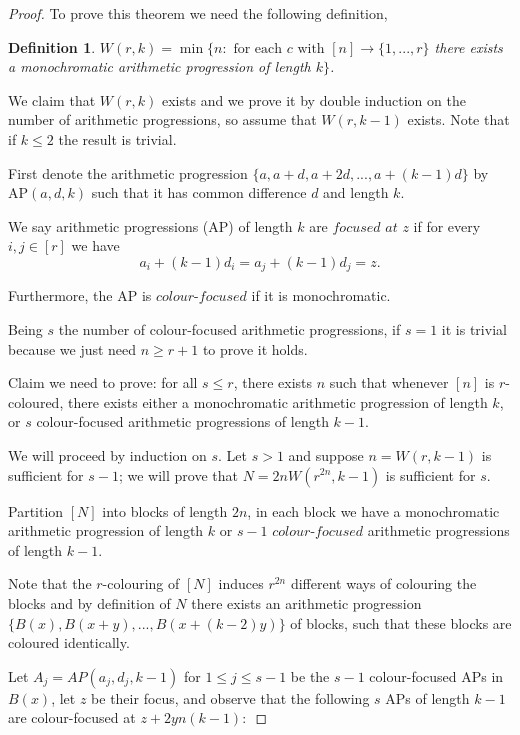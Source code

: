 \documentclass[12pt,twoside,a4paper]{book}
\numberwithin{equation}{section}
\newtheorem{definition}	[theorem] {Definition}
\theoremstyle{remark}
\begin{document}
\begin{proof}To prove this theorem we need the following definition,

\begin{definition}
$W(r,k) = \min \{n \colon \text{ for each } c \text{ with } [n] \rightarrow \{1,...,r\}$ there exists a monochromatic arithmetic  progression of length $k \}$.
\end{definition}

We claim that $W(r,k)$ exists and we prove it by double induction on the number of arithmetic progressions, so assume that $W(r, k-1)$ exists. Note that if $k \leq 2$ the result is trivial.

First denote the arithmetic progression $\{a, a + d, a +2d, ..., a+(k-1)d\}$ by AP$(a,d,k)$ such that it has common difference  $d$ and length $k$.

We say arithmetic progressions (AP) of length $k$ are $\textit{focused at}$ $z$ if for every $i,j \in [r]$ we have
$$ a_i +  (k-1)d_i = a_j  + (k-1) d_j = z .$$

Furthermore, the AP is $\textit{colour-focused}$ if it is monochromatic.

Being $s$ the number of colour-focused arithmetic progressions, if $s=1$ it is trivial because we just need $n \geq r+1$ to prove it holds.

Claim we need to prove: for all $s \leq r$, there exists $n$ such that whenever $[n]$ is $r$-coloured, there exists either a monochromatic arithmetic progression of length $k$, or $s$ colour-focused arithmetic progressions of length $k-1$.

We will proceed by induction on $s$. Let $s > 1$ and suppose $n=W(r,k-1)$ is sufficient for $s-1$; we will prove that $N=2n W(r^{2n},k-1)$ is sufficient for $s$.

Partition $[N]$ into blocks of length $2n$, in each block we have a monochromatic arithmetic progression of length $k$ or $s-1$ $\textit{colour-focused}$ arithmetic progressions of length $k-1$. 

Note that the $r$-colouring of $[N]$ induces $r^{2n}$ different ways of colouring the blocks and by definition of $N$ there exists an arithmetic progression $\{B(x), B(x+y), ... , B(x+(k-2)y)\}$ of blocks, such that these blocks are coloured identically.

Let $A_j = AP(a_j, d_j, k-1)$ for $1 \leq j \leq s-1$ be the $s-1$ colour-focused APs in $B(x)$, let $z$ be their focus, and observe that the following $s$ APs of length $k-1$ are colour-focused at $z+ 2yn(k-1) \colon$


\end{proof}
\end{document}
